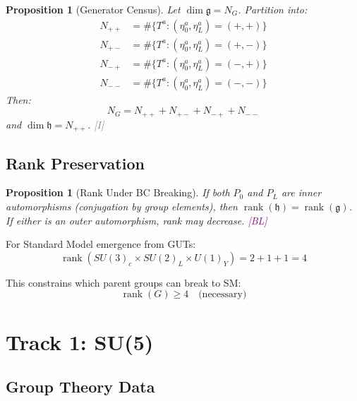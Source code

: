 \documentclass[11pt,a4paper]{article}
\newtheorem{proposition}[theorem]{Proposition}
\newcommand{\tagI}{\textcolor{gray}{[I]}}
\newcommand{\tagBL}{\textcolor{purple}{[BL]}}
\DeclareMathOperator{\rank}{rank}
\begin{document}
\begin{proposition}[Generator Census]
\label{prop:gen-count}
Let $\dim \mathfrak{g} = N_G$. Partition into:
\begin{align}
\label{eq:n++}
N_{++} &= \#\{T^a : (\eta_0^a, \eta_L^a) = (+,+)\} \\
\label{eq:n+-}
N_{+-} &= \#\{T^a : (\eta_0^a, \eta_L^a) = (+,-)\} \\
\label{eq:n-+}
N_{-+} &= \#\{T^a : (\eta_0^a, \eta_L^a) = (-,+)\} \\
\label{eq:n--}
N_{--} &= \#\{T^a : (\eta_0^a, \eta_L^a) = (-,-)\}
\end{align}
Then:
\begin{equation}
\label{eq:dim-sum}
N_G = N_{++} + N_{+-} + N_{-+} + N_{--}
\end{equation}
and $\dim \mathfrak{h} = N_{++}$. \tagI
\end{proposition}

\subsection{Rank Preservation}

\begin{proposition}[Rank Under BC Breaking]
\label{prop:rank}
If both $P_0$ and $P_L$ are inner automorphisms (conjugation by group elements),
then $\rank(\mathfrak{h}) = \rank(\mathfrak{g})$. If either is an outer automorphism,
rank may decrease. \tagBL
\end{proposition}

For Standard Model emergence from GUTs:
\begin{equation}
\label{eq:sm-rank}
\rank(SU(3)_c \times SU(2)_L \times U(1)_Y) = 2 + 1 + 1 = 4
\end{equation}

This constrains which parent groups can break to SM:
\begin{equation}
\label{eq:rank-constraint}
\rank(G) \geq 4 \quad \text{(necessary)}
\end{equation}

\section{Track 1: SU(5)}

\subsection{Group Theory Data}
\end{document}

